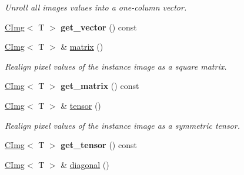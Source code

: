\begin{DoxyCompactItemize}
\begin{DoxyCompactList}\small\item\em Unroll all images values into a one-\/column vector. \item\end{DoxyCompactList}\item 
\hypertarget{structcimg__library_1_1CImg_aae2388b58974ab43913f13c2df391c94}{
\hyperlink{structcimg__library_1_1CImg}{CImg}$<$ T $>$ {\bfseries get\_\-vector} () const }
\label{structcimg__library_1_1CImg_aae2388b58974ab43913f13c2df391c94}

\item 
\hypertarget{structcimg__library_1_1CImg_aec22e09b5cba5e5f6bb4174322a95019}{
\hyperlink{structcimg__library_1_1CImg}{CImg}$<$ T $>$ \& \hyperlink{structcimg__library_1_1CImg_aec22e09b5cba5e5f6bb4174322a95019}{matrix} ()}
\label{structcimg__library_1_1CImg_aec22e09b5cba5e5f6bb4174322a95019}

\begin{DoxyCompactList}\small\item\em Realign pixel values of the instance image as a square matrix. \item\end{DoxyCompactList}\item 
\hypertarget{structcimg__library_1_1CImg_a20cece29b099a16e575f36ce597f2a5c}{
\hyperlink{structcimg__library_1_1CImg}{CImg}$<$ T $>$ {\bfseries get\_\-matrix} () const }
\label{structcimg__library_1_1CImg_a20cece29b099a16e575f36ce597f2a5c}

\item 
\hypertarget{structcimg__library_1_1CImg_a5d2d10755254c77c93b671d7cce54dcf}{
\hyperlink{structcimg__library_1_1CImg}{CImg}$<$ T $>$ \& \hyperlink{structcimg__library_1_1CImg_a5d2d10755254c77c93b671d7cce54dcf}{tensor} ()}
\label{structcimg__library_1_1CImg_a5d2d10755254c77c93b671d7cce54dcf}

\begin{DoxyCompactList}\small\item\em Realign pixel values of the instance image as a symmetric tensor. \item\end{DoxyCompactList}\item 
\hypertarget{structcimg__library_1_1CImg_a2c935f6e89c8a860559029a74fcac80a}{
\hyperlink{structcimg__library_1_1CImg}{CImg}$<$ T $>$ {\bfseries get\_\-tensor} () const }
\label{structcimg__library_1_1CImg_a2c935f6e89c8a860559029a74fcac80a}

\item 
\hypertarget{structcimg__library_1_1CImg_a9b38ad4f425b6b4768d5ee82cb562119}{
\hyperlink{structcimg__library_1_1CImg}{CImg}$<$ T $>$ \& \hyperlink{structcimg__library_1_1CImg_a9b38ad4f425b6b4768d5ee82cb562119}{diagonal} ()}
\label{structcimg__library_1_1CImg_a9b38ad4f425b6b4768d5ee82cb562119}


\end{DoxyCompactItemize}
